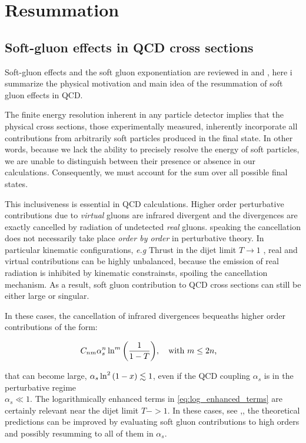 \documentclass[../main.tex]{subfiles}
\begin{document}
\section{Resummation}


\subsection{Soft-gluon effects in QCD cross sections}

Soft-gluon effects and the soft gluon exponentiation are reviewed in \cite{Catani_1997} and \cite{catani1997softgluon}, here i summarize the physical 
motivation and main idea of the resummation of soft gluon effects in QCD.

The finite energy resolution inherent in any particle detector implies that the physical cross sections, 
those experimentally measured, inherently incorporate all contributions from arbitrarily soft particles 
produced in the final state. In other words, because we lack the ability to precisely resolve the energy 
of soft particles, we are unable to distinguish between their presence or absence in our calculations. 
Consequently, we must account for the sum over all possible final states.

This inclusiveness is essential in QCD calculations. Higher order perturbative contributions due to \emph{virtual}
gluons are infrared divergent and the divergences are exactly  cancelled by radiation of undetected \emph{real} gluons.
speaking the cancellation does not necessarily take place \emph{order by order} in perturbative theory.
In particular kinematic configurations, \emph{e.g} Thrust in the dijet limit $T \to 1$ ,   
real and virtual contributions can be highly unbalanced, because the emission of real radiation is inhibited by kinematic constrainsts,
spoiling the cancellation mechanism. As a result, soft gluon contribution to QCD cross sections can still be either large or singular.

In these cases, the cancellation of infrared divergences bequeaths higher order contributions of the form:

\begin{equation}\label{eq:log_enhanced_terms}
    C_{nm} \alpha_s^n \ln^m\qty(\frac{1}{1-T}) , \qq{with $m \le 2n $,}
\end{equation}

that can become large, $\alpha_s \ln^2\qty(1-x)\lesssim 1$, even if the QCD coupling $\alpha_s$ is in the perturbative regime \\
$\alpha_s \ll 1$.
The logarithmically enhanced terms in \cref{eq:log_enhanced_terms} are certainly relevant near the dijet limit $T->1$.
In these cases, see \cite{CATANI19933},\cite{CATANI1991491}, the theoretical predictions can be improved by evaluating soft gluon 
contributions to high orders and possibly resumming to all of them in $\alpha_s$.
\end{document}
